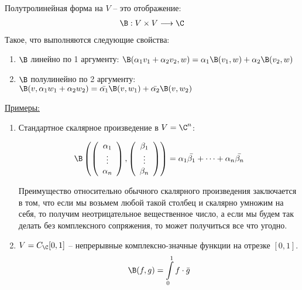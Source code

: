 \begin{conj}
    Полутролинейная форма на $V$ -- это отображение: 
    \begin{gather*}
        \B: V \times V \longrightarrow \C
    \end{gather*}
    Такое, что выполняются следующие свойства: 
    \begin{enumerate}
        \item $\B$ линейно по 1 аргументу: $\B(\alpha_1 v_1 + \alpha_2 v_2, w) = \alpha_1 \B(v_1, w) + \alpha_2 \B(v_2, w)$
        \item $\B$ полулинейно по 2 аргументу: $\B(v, \alpha_1 w_1 + \alpha_2 w_2) = \bar{\alpha_1} \B(v, w_1) + \bar{\alpha_2}\B(v, w_2)$
    \end{enumerate}
    \underline{Примеры:}
    \begin{enumerate}
        \item Стандартное скалярное произведение в $V = \C^n$:
        
        \begin{gather*}
            \B\left(\left(\begin{array}{c}
            \alpha_1 \\ 
            \vdots \\ 
            \alpha_n
            \end{array}\right), 
            \left(\begin{array}{c}
            \beta_1 \\ 
            \vdots \\ 
            \beta_n
            \end{array}\right)\right) 
            = \alpha_1 \bar{\beta_1} + \dots + \alpha_n \bar{\beta_n}
        \end{gather*}

        Преимущество относительно обычного скалярного произведения заключается в том, что если мы возьмем любой такой столбец и
        скалярно умножим на себя, то получим неотрицательное вещественное число, а если мы будем так делать без комплексного 
        сопряжения, то может получиться все что угодно.

        \item $V = C_{\C} [0, 1]$ -- непрерывные комплексно-значные функции на отрезке $[0, 1]$.
        \begin{gather*}
            \B(f, g) = \int\limits_0^1 f \cdot \bar{g}
        \end{gather*}
    \end{enumerate}    
\end{conj}

